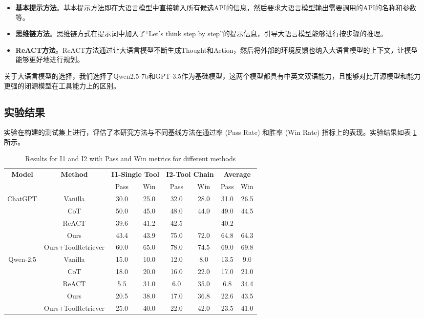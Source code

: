 \begin{itemize}
  \item  \textbf{基本提示方法}。基本提示方法即在大语言模型中直接输入所有候选API的信息，然后要求大语言模型输出需要调用的API的名称和参数等。
  \item  \textbf{思维链方法}\cite{Wang2023a}。思维链方式在提示词中加入了“Let's think step by step”的提示信息，引导大语言模型能够进行按步骤的推理。
  \item  \textbf{ReACT方法}\cite{Yao2023b}。ReACT方法通过让大语言模型不断生成Thought和Action，然后将外部的环境反馈也纳入大语言模型的上下文，让模型能够更好地进行规划。
\end{itemize}
\indent

关于大语言模型的选择，我们选择了Qwen2.5-7b和GPT-3.5作为基础模型，这两个模型都具有中英文双语能力，且能够对比开源模型和能力更强的闭源模型在工具能力上的区别。

\subsection{实验结果}
实验在构建的测试集上进行，评估了本研究方法与不同基线方法在通过率 (Pass Rate) 和胜率 (Win Rate) 指标上的表现。实验结果如表 \ref{tab:simplified_pass_win} 所示。


\begin{table}[!ht]
  \centering
  \begin{tabular}{c|c|cc|cc|cc}
  \toprule
  \textbf{Model} & \textbf{Method} & \multicolumn{2}{c|}{\textbf{I1-Single Tool}} & \multicolumn{2}{c|}{\textbf{I2-Tool Chain}} & \multicolumn{2}{c}{\textbf{Average}} \\
  & & Pass & Win & Pass & Win & Pass & Win \\
  \midrule
  ChatGPT & Vanilla          & 30.0 & 25.0 & 32.0 & 28.0 & 31.0 & 26.5 \\
          & CoT              & 50.0 & 45.0 & 48.0 & 44.0 & 49.0 & 44.5 \\
          & ReACT            & 39.6 & 41.2    & 42.5 & -    & 40.2 & -    \\
          & Ours             & 43.4 & 43.9 & 75.0 & 72.0 & 64.8 & 64.3 \\
          & Ours+ToolRetriever & 60.0 & 65.0 & 78.0 & 74.5 & 69.0 & 69.8 \\
  \midrule
  Qwen-2.5 & Vanilla          & 15.0 & 10.0 & 12.0 & 8.0  & 13.5 & 9.0  \\
           & CoT              & 18.0 & 20.0 & 16.0 & 22.0 & 17.0 & 21.0 \\
           & ReACT            & 5.5  & 31.0 & 6.0  & 35.0 & 6.8  & 34.4 \\
           & Ours             & 20.5 & 38.0 & 17.0 & 36.8 & 22.6 & 43.5 \\
           & Ours+ToolRetriever & 25.0 & 40.0 & 22.0 & 42.0 & 23.5 & 41.0 \\
  \bottomrule
  \end{tabular}
  \caption{Results for I1 and I2 with Pass and Win metrics for different methods}
  \label{tab:simplified_pass_win}
\end{table}

